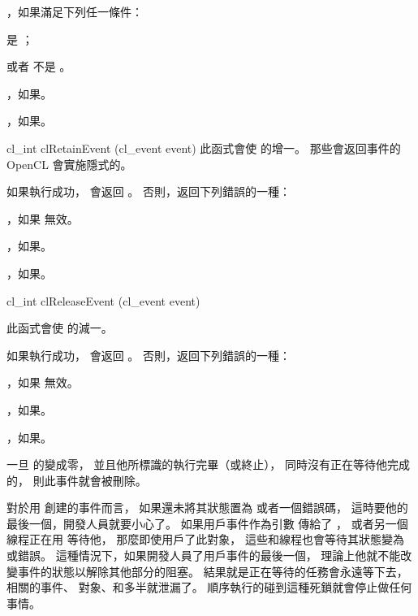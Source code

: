 \startitem
{}，如果滿足下列任一條件：
\startigBase
\item {} 是 ；
\item 或者  不是 。
\stopigBase
\stopitem

\item {}，如果\scdevfailres。

\item {}，如果\schostfailres。
\stopigBase


\startCLFUNC
cl_int clRetainEvent (cl_event event)
\stopCLFUNC
此函式會使  的增一。
那些會返回事件的 OpenCL 會實施隱式的。

如果執行成功，  會返回 。
否則，返回下列錯誤的一種：
\startigBase
\item {}，如果  無效。

\item {}，如果\scdevfailres。

\item {}，如果\schostfailres。
\stopigBase


\startCLFUNC
cl_int clReleaseEvent (cl_event event)
\stopCLFUNC

此函式會使  的減一。

如果執行成功，  會返回 。
否則，返回下列錯誤的一種：
\startigBase
\item {}，如果  無效。

\item {}，如果\scdevfailres。

\item {}，如果\schostfailres。
\stopigBase

一旦  的變成零，
並且他所標識的執行完畢（或終止），
同時沒有正在等待他完成的，
則此事件就會被刪除。

\startnotepar
對於用  創建的事件而言，
如果還未將其狀態置為  或者一個錯誤碼，
這時要他的最後一個，開發人員就要小心了。
如果用戶事件作為引數  傳給了 ，
或者另一個線程正在用  等待他，
那麼即使用戶了此對象，
這些和線程也會等待其狀態變為  或錯誤。
這種情況下，如果開發人員了用戶事件的最後一個，
理論上他就不能改變事件的狀態以解除其他部分的阻塞。
結果就是正在等待的任務會永遠等下去，
相關的事件、  對象、和多半就泄漏了。
順序執行的碰到這種死鎖就會停止做任何事情。
\stopnotepar
